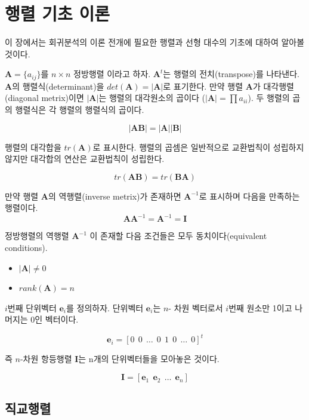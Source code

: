\documentclass[
]{book}
\providecommand{\tightlist}{%
  \setlength{\itemsep}{0pt}\setlength{\parskip}{0pt}}
\theoremstyle{definition}
\theoremstyle{definition}
\theoremstyle{definition}
\theoremstyle{definition}
\theoremstyle{remark}
\begin{document}
\hypertarget{appendix-appendix}{%
\appendix {}}


\hypertarget{matrixalgebra}{%
\chapter{행렬 기초 이론}\label{matrixalgebra}}

이 장에서는 회귀분석의 이론 전개에 필요한 행렬과 선형 대수의 기초에 대하여 알아볼 것이다.

\(\bm A = \{ a_{ij} \}\)를 \(n \times n\) 정방행렬 이라고 하자. \(\bm A^t\)는 행렬의 전치(transpose)를 나타낸다. \(\bm A\)의 행렬식(determinant)을 \(det(\bm A)=|\bm A|\)로 표기한다. 만약 행렬 \(\bm A\)가 대각행렬(diagonal metrix)이면 \(|\bm A|\)는 행렬의 대각원소의 곱이다 (\(| \bm A| =\prod a_{ii}\)). 두 행렬의 곱의 행렬식은 각 행렬의 행렬식의 곱이다.

\[ |\bm A \bm B | = | \bm A| |\bm B| \]

행렬의 대각합을 \(tr(\bm A)\)로 표시한다. 행렬의 곱셈은 일반적으로 교환법칙이 성립하지 않지만 대각합의 연산은 교환법칙이 성립한다.

\[  tr(\bm A \bm B)  = tr( \bm B \bm A) \]

만약 행렬 \(\bm A\)의 역행렬(inverse metrix)가 존재하면 \(\bm A^{-1}\)로 표시하며 다음을 만족하는 행렬이다.
\[ \bm A \bm A^{-1} = \bm A^{-1} = \bm I \]

정방행렬의 역행렬 \(\bm A^{-1}\) 이 존재할 다음 조건들은 모두 동치이다(equivalent conditions).

\begin{itemize}
\tightlist
\item
  \(|\bm A| \ne 0\)
\item
  \(rank(\bm A) = n\)
\end{itemize}

\(i\)번째 단위벡터 \(\bm e_i\)를 정의하자. 단위벡터 \(\bm e_i\)는 \(n\)- 차원 벡터로서 \(i\)번째 원소만 1이고 나머지는 0인 벡터이다.

\[ \bm e_i = [0 ~~0 ~~\dots~~ 0 ~~ 1 ~~ 0 ~~ \dots ~~ 0 ]^t \]

즉 \(n\)-차원 항등행렬 \(\bm I\)는 n개의 단위벡터들을 모아놓은 것이다.

\[  \bm I = [ \bm e_1 ~~ \bm e_2 ~~ \dots ~~ \bm e_n ] \]

\hypertarget{uxc9c1uxad50uxd589uxb82c}{%
\section{직교행렬}\label{uxc9c1uxad50uxd589uxb82c}}
\end{document}
